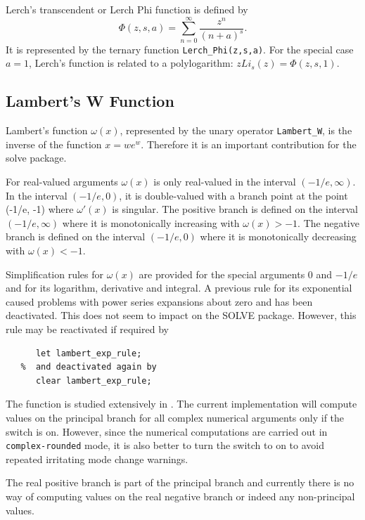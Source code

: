 Lerch's transcendent or Lerch Phi function is defined by
\[\Phi(z,s,a) = \sum_{n=0}^\infty \frac{z^n}{(n+a)^s}.\]
It is represented by the ternary function \texttt{Lerch\_Phi(z,s,a)}.
For the special case $a=1$, Lerch's function is related to a polylogarithm:
$z Li_s(z) = \Phi(z,s,1)$.

\subsection{Lambert's W Function}
\hypertarget{LAMBERTW}{}

Lambert's function $\omega(x)$, represented by the unary
operator \texttt{Lambert\_W}, is the inverse of the function
$x=we^w$. Therefore it is an important contribution for the solve
package.

For real-valued arguments $\omega(x)$ is only real-valued in the
interval $(-1/e, \infty)$.  In the interval $(-1/e, 0)$, it is double-valued
with a branch point at the point (-1/e, -1) where $\omega'(x)$ is singular.
The positive branch is defined on the interval $(-1/e, \infty)$ where it is
monotonically increasing with $\omega(x) > -1$. The negative branch is defined
on the interval $(-1/e, 0)$ where it is monotonically decreasing with
$\omega(x) < -1$.

Simplification rules for $\omega(x)$ are provided for the special arguments
$0$ and $-1/e$ and for its logarithm, derivative and integral.
A previous rule for its exponential caused problems with power series expansions
about zero and has been deactivated. This does not seem to impact on the SOLVE
package. However, this rule may be reactivated if required by
\begin{verbatim}
      let lambert_exp_rule;
   %  and deactivated again by
      clear lambert_exp_rule;
\end{verbatim}

The function is studied extensively in \cite{HareCorless:92}.
The current implementation will compute values on the principal branch for
all complex numerical arguments  only if the switch  is on.
However, since the numerical computations are carried out in
\texttt{complex-rounded} mode, it is also better to turn the switch
 to on to avoid repeated irritating mode change warnings.

The real positive branch is part of the principal branch and currently there
is no way of computing values on the real negative  branch or indeed any
non-principal values.

